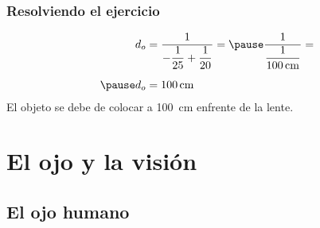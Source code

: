 \documentclass[14pt]{beamer}
\begin{document}
\begin{frame}
\frametitle{Resolviendo el ejercicio}
\vspace*{-1cm}
\pause
\begin{eqnarray*}
\begin{aligned}
d_{o} &= \dfrac{1}{- \dfrac{1}{25} + \dfrac{1}{20}} = \pause \dfrac{1}{\dfrac{1}{\SI{100}{\centi\meter}}} = \\[0.5em] \pause
d_{o} &= \SI{100}{\centi\meter}     
\end{aligned}
\end{eqnarray*}
\pause
El objeto se debe de colocar a \SI{100}{\centi\meter} enfrente de la lente.
\end{frame}

\section{El ojo y la visión}
\subsection{El ojo humano}
\end{document}
